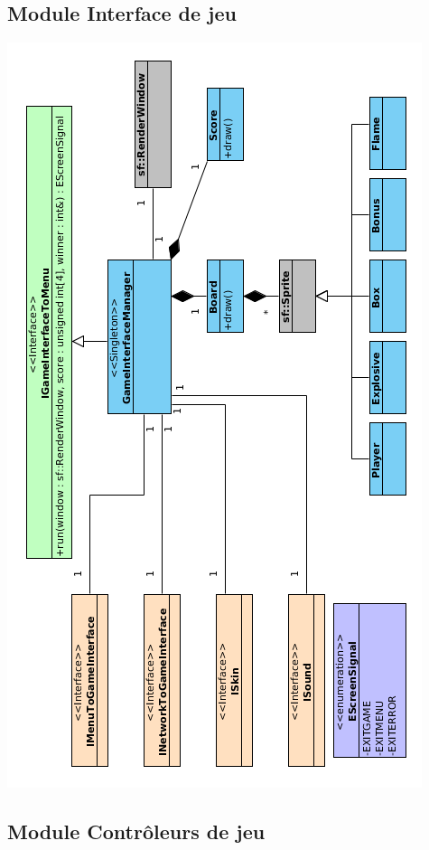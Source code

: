 \subsection{Module Interface de jeu}

\begin{center}
\includegraphics[scale=0.8]{images/UML/gameInterface.png}
\end{center}

\subsection{Module Contrôleurs de jeu}

